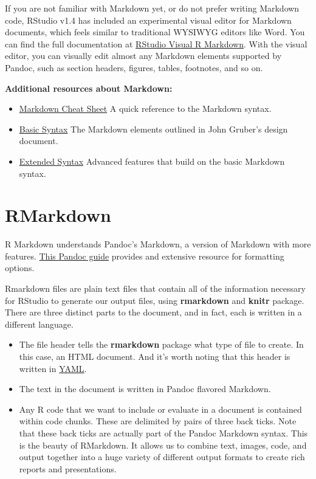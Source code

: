 \documentclass[
]{book}
\providecommand{\tightlist}{%
  \setlength{\itemsep}{0pt}\setlength{\parskip}{0pt}}
\begin{document}
If you are not familiar with Markdown yet, or do not prefer writing Markdown code, RStudio v1.4 has included an experimental visual editor for Markdown documents, which feels similar to traditional WYSIWYG editors like Word. You can find the full documentation at \href{https://rstudio.github.io/visual-markdown-editing/}{RStudio Visual R Markdown}. With the visual editor, you can visually edit almost any Markdown elements supported by Pandoc, such as section headers, figures, tables, footnotes, and so on.

\textbf{Additional resources about Markdown:}

\begin{itemize}
\tightlist
\item
  \href{https://www.markdownguide.org/cheat-sheet/}{Markdown Cheat Sheet}
  A quick reference to the Markdown syntax.
\item
  \href{https://www.markdownguide.org/basic-syntax/}{Basic Syntax}
  The Markdown elements outlined in John Gruber's design document.
\item
  \href{https://www.markdownguide.org/extended-syntax/}{Extended Syntax}
  Advanced features that build on the basic Markdown syntax.
\end{itemize}

\hypertarget{rmarkdown-1}{%
\section{RMarkdown}\label{rmarkdown-1}}

R Markdown understands Pandoc's Markdown, a version of Markdown with more features. \href{https://pandoc.org/MANUAL.html\#pandocs-markdown}{This Pandoc guide} provides and extensive resource for formatting options.

Rmarkdown files are plain text files that contain all of the information necessary for RStudio to generate our output files, using \textbf{rmarkdown} and \textbf{knitr} package. There are three distinct parts to the document, and in fact, each is written in a different language.

\begin{itemize}
\tightlist
\item
  The file header tells the \textbf{rmarkdown} package what type of file to create. In this case, an HTML document. And it's worth noting that this header is written in \href{https://yaml.org/}{YAML}.
\item
  The text in the document is written in Pandoc flavored Markdown.
\item
  Any R code that we want to include or evaluate in a document is contained within code chunks. These are delimited by pairs of three back ticks. Note that these back ticks are actually part of the Pandoc Markdown syntax. This is the beauty of RMarkdown. It allows us to combine text, images, code, and output together into a huge variety of different output formats to create rich reports and presentations.
\end{itemize}
\end{document}
